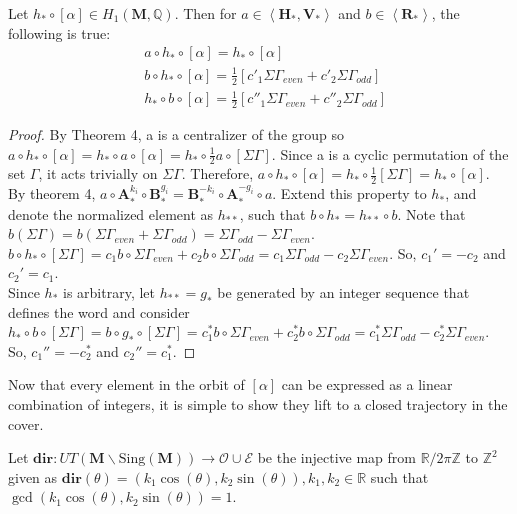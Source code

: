 \documentclass[]{article}
\begin{document}
\begin{lem}
Let $h_*\circ[\alpha]\in H_1(\mathbf{M},\mathbb{Q})$. Then for $a\in\left<\mathbf{H}_*, \mathbf{V}_*\right>$ and $b\in\left<\mathbf{R}_*\right>$, the following is true:
\begin{align*}
& a\circ h_*\circ[\alpha]=h_*\circ[\alpha]\\
& b\circ h_*\circ[\alpha]=\frac{1}{2}[c'_1\Sigma\Gamma_{even}+c'_2\Sigma\Gamma_{odd}]\\
& h_*\circ b\circ[\alpha]=\frac{1}{2}[c''_1\Sigma\Gamma_{even}+c''_2\Sigma\Gamma_{odd}]
\end{align*}
\begin{proof}
By Theorem 4, a is a centralizer of the group so $a\circ h_*\circ[\alpha]=h_*\circ a \circ[\alpha]=h_*\circ \frac{1}{2}a \circ[\Sigma\Gamma].$ Since a is a cyclic permutation of the set $\Gamma$, it acts trivially on $\Sigma\Gamma$. Therefore, $a\circ h_*\circ[\alpha]=h_*\circ \frac{1}{2}[\Sigma\Gamma]=h_* \circ[\alpha]$.\\
By theorem 4, $a\circ\mathbf{A}_*^{k_i}\circ\mathbf{B}_*^{g_i}=\mathbf{B}_*^{-k_i}\circ\mathbf{A}_*^{-g_i}\circ a$. Extend this property to $h_*$, and denote the normalized element as $h_{**}$, such that $b\circ h_{*}=h_{**}\circ b$.  Note that $b(\Sigma\Gamma)=b(\Sigma\Gamma_{even}+\Sigma\Gamma_{odd})=\Sigma\Gamma_{odd}-\Sigma\Gamma_{even}$. $b\circ h_*\circ[\Sigma\Gamma]=c_1b\circ\Sigma\Gamma_{even}+c_2b\circ\Sigma\Gamma_{odd}=c_1\Sigma\Gamma_{odd}-c_2\Sigma\Gamma_{even}.$ So, $c_1'=-c_2$ and $c_2'=c_1$.\\
Since $h_*$ is arbitrary, let $h_{**}=g_{*}$ be generated by an integer sequence that defines the word and consider $h_*\circ b\circ[\Sigma\Gamma]=b\circ g_{*}\circ[\Sigma\Gamma]=c^*_1b\circ\Sigma\Gamma_{even}+c^*_2b\circ\Sigma\Gamma_{odd}=c^*_1\Sigma\Gamma_{odd}-c_2^*\Sigma\Gamma_{even}.$ So, $c_1''=-c_2^*$ and $c_2''=c_1^*$.
\end{proof}
\end{lem}

\noindent Now that every element in the orbit of $[\alpha]$ can be expressed as a linear combination of integers, it is simple to show they lift to a closed trajectory in the cover.

\begin{Def}
Let $\mathbf{dir}:UT(\mathbf{M}\backslash\text{Sing}(\mathbf{M}))\rightarrow\mathcal{O}\cup\mathcal{E}$ be the injective map from $\mathbb{R}/2\pi\mathbb{Z}$ to $\mathbb{Z}^2$ given as $\mathbf{dir}(\theta)=(k_1\cos(\theta),k_2\sin(\theta)), k_1,k_2\in\mathbb{R}$ such that $\gcd(k_1\cos(\theta),k_2\sin(\theta))=1$.
\end{Def}
\end{document}
